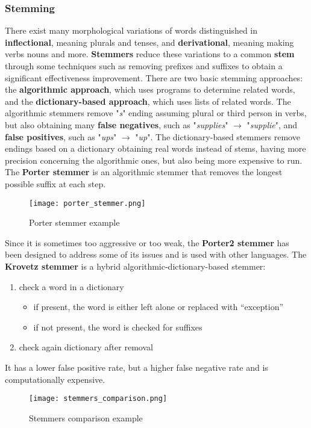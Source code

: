 \documentclass{article}
\begin{document}
\subsubsection{Stemming}
There exist many morphological variations of words distinguished in \textbf{inflectional}, meaning plurals and tenses, and \textbf{derivational}, meaning making verbs nouns and more.
\textbf{Stemmers} reduce these variations to a common \textbf{stem} through some techniques such as removing prefixes and suffixes to obtain a significant effectiveness improvement. There are two basic stemming approaches: the \textbf{algorithmic approach}, which uses programs to determine related words, and the \textbf{dictionary-based approach}, which uses lists of related words.
The algorithmic stemmers remove "\textit{s}" ending assuming plural or third person in verbs, but also obtaining many \textbf{false negatives}, such as "\textit{supplies}" $\rightarrow$ "\textit{supplie}", and \textbf{false positives}, such as "\textit{ups}" $\rightarrow$ "\textit{up}".
The dictionary-based stemmers remove endings based on a dictionary obtaining real words instead of stems, having more precision concerning the algorithmic ones, but also being more expensive to run. 
The \textbf{Porter stemmer} is an algorithmic stemmer that removes the longest possible suffix at each step.
\begin{figure}[h]
    \centering
    \texttt{[image: porter\_stemmer.png]}
    \caption{Porter stemmer example}
\end{figure}
Since it is sometimes too aggressive or too weak, the \textbf{Porter2 stemmer} has been designed to address some of its issues and is used with other languages.
The \textbf{Krovetz stemmer} is a hybrid algorithmic-dictionary-based stemmer:
\begin{enumerate}
    \item check a word in a dictionary
        \begin{itemize}
            \item if present, the word is either left alone or replaced with “exception”
            \item if not present, the word is checked for suffixes
        \end{itemize}
    \item check again dictionary after removal
\end{enumerate}
It has a lower false positive rate, but a higher false negative rate and is computationally expensive.
\begin{figure}[h]
    \centering
    \texttt{[image: stemmers\_comparison.png]}
    \caption{Stemmers comparison example}
\end{figure}
\end{document}

